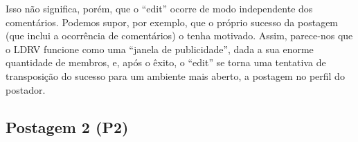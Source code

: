 \documentclass{textolivre}
\begin{document}
Isso não significa, porém, que o “edit” ocorre de modo independente dos comentários. Podemos supor, por exemplo, que o próprio sucesso da postagem (que inclui a ocorrência de comentários) o tenha motivado. Assim, parece-nos que o LDRV funcione como uma “janela de publicidade”, dada a sua enorme quantidade de membros, e, após o êxito, o “edit” se torna uma tentativa de transposição do sucesso para um ambiente mais aberto, a postagem no perfil do postador.


\subsection{Postagem 2 (P2)}\label{sec-postagem2}


\begin{figure}[htbp]
 \begin{minipage}{.45\textwidth}
 \centering

\end{minipage}
\end{figure}
\end{document}
